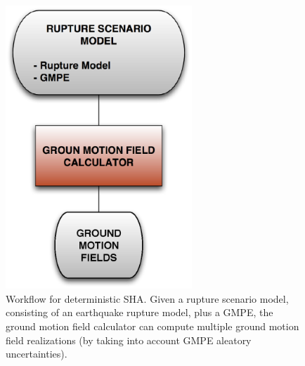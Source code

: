 \begin{figure}[htbp]
\begin{center}
\includegraphics[width=7cm]{./Figures/Part_Hazard/deterministic_workflow.eps}
\caption{Workflow for deterministic SHA. Given a rupture scenario model, 
consisting of an earthquake rupture model, plus a GMPE, the ground motion 
field calculator can compute multiple ground motion field realizations (by 
taking into account GMPE aleatory uncertainties).}
\label{deterministic_workflow}
\end{center}
\end{figure}
%